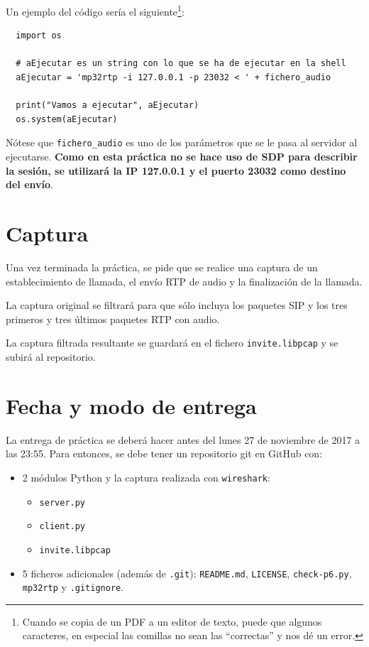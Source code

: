 \documentclass[a4paper,11pt]{article}
\begin{document}
Un ejemplo del código sería el siguiente\footnote{Cuando se copia de un PDF
a un editor de texto, puede que algunos caracteres, en especial las comillas
no sean las ``correctas'' y nos dé un error.}:

\begin{verbatim}
  import os

  # aEjecutar es un string con lo que se ha de ejecutar en la shell
  aEjecutar = 'mp32rtp -i 127.0.0.1 -p 23032 < ' + fichero_audio 

  print("Vamos a ejecutar", aEjecutar)
  os.system(aEjecutar)
\end{verbatim}

Nótese que \texttt{fichero\_audio} es uno de los parámetros que se le pasa al servidor al ejecutarse. {\bf Como en esta práctica no se hace uso de SDP para describir la sesión, se utilizará la IP 127.0.0.1 y el puerto 23032 como
destino del envío}.

\section*{Captura}

Una vez terminada la práctica, se pide que se realice una captura de un
establecimiento de llamada, el envío RTP de audio y la finalización de
la llamada. 

La captura original se filtrará para que sólo incluya los paquetes
SIP y los tres primeros y tres últimos paquetes RTP con audio.

La captura filtrada resultante se guardará en el fichero \texttt{invite.libpcap}
y se subirá al repositorio.


\section*{Fecha y modo de entrega}

La entrega de práctica se deberá hacer antes del lunes 27 de noviembre de 2017 a las 23:55. Para entonces, se debe tener un repositorio git en GitHub con: 

    \begin{itemize}
        \item 2 módulos Python y la captura realizada con \texttt{wireshark}:
    \begin{itemize}
      \item \texttt{server.py}
      \item \texttt{client.py}
      \item \texttt{invite.libpcap}
    \end{itemize}
    \item 5 ficheros adicionales (además de \texttt{.git}): \texttt{README.md}, \texttt{LICENSE}, \texttt{check-p6.py}, \texttt{mp32rtp} y \texttt{.gitignore}.
\end{itemize}
\end{document}
